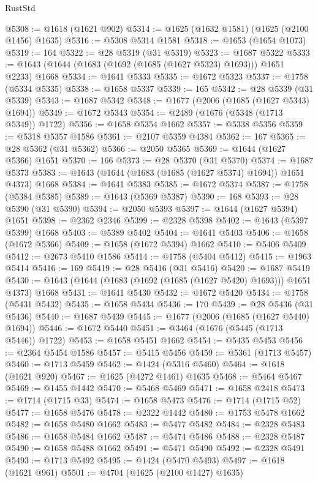 \begin{lexlean}{RustStd}
\begin{coremodule}
@5308 := @1618 (@1621 @902)
@5314 := @1625 (@1632 @1581) (@1625 (@2100 @1456) @1635)
@5316 := @5308 @5314 @1581
@5318 := @1653 (@1654 @1073)
@5319 := 164
@5322 := @28 @5319 (@31 @5319)
@5323 := @1687 @5322
@5333 := @1643 (@1644 (@1683 (@1692 (@1685 (@1627 @5323) @1693))) @1651 @2233) @1668
@5334 := @1641 @5333
@5335 := @1672 @5323
@5337 := @1758 (@5334 @5335)
@5338 := @1658 @5337
@5339 := 165
@5342 := @28 @5339 (@31 @5339)
@5343 := @1687 @5342
@5348 := @1677 (@2006 (@1685 (@1627 @5343) @1694))
@5349 := @1672 @5343
@5354 := @2489 (@1676 (@5348 (@1713 @5349)) @1722)
@5356 := @1658 @5354 @1662
@5357 := @5338 @5356
@5359 := @5318 @5357 @1586
@5361 := @2107 @5359 @4384
@5362 := 167
@5365 := @28 @5362 (@31 @5362)
@5366 := @2050 @5365
@5369 := @1644 (@1627 @5366) @1651
@5370 := 166
@5373 := @28 @5370 (@31 @5370)
@5374 := @1687 @5373
@5383 := @1643 (@1644 (@1683 (@1685 (@1627 @5374) @1694)) @1651 @4373) @1668
@5384 := @1641 @5383
@5385 := @1672 @5374
@5387 := @1758 (@5384 @5385)
@5389 := @1643 (@5369 @5387)
@5390 := 168
@5393 := @28 @5390 (@31 @5390)
@5394 := @2050 @5393
@5397 := @1644 (@1627 @5394) @1651
@5398 := @2362 @2346
@5399 := @2328 @5398
@5402 := @1643 (@5397 @5399) @1668
@5403 := @5389 @5402
@5404 := @1641 @5403
@5406 := @1658 (@1672 @5366)
@5409 := @1658 (@1672 @5394) @1662
@5410 := @5406 @5409
@5412 := @2673 @5410 @1586
@5414 := @1758 (@5404 @5412)
@5415 := @1963 @5414
@5416 := 169
@5419 := @28 @5416 (@31 @5416)
@5420 := @1687 @5419
@5430 := @1643 (@1644 (@1683 (@1692 (@1685 (@1627 @5420) @1693))) @1651 @4373) @1668
@5431 := @1641 @5430
@5432 := @1672 @5420
@5434 := @1758 (@5431 @5432)
@5435 := @1658 @5434
@5436 := 170
@5439 := @28 @5436 (@31 @5436)
@5440 := @1687 @5439
@5445 := @1677 (@2006 (@1685 (@1627 @5440) @1694))
@5446 := @1672 @5440
@5451 := @3464 (@1676 (@5445 (@1713 @5446)) @1722)
@5453 := @1658 @5451 @1662
@5454 := @5435 @5453
@5456 := @2364 @5454 @1586
@5457 := @5415 @5456
@5459 := @5361 (@1713 @5457)
@5460 := @1713 @5459
@5462 := @1424 (@5316 @5460)
@5464 := @1618 (@1621 @920)
@5467 := @1625 (@4272 @1461) @1635
@5468 := @5464 @5467
@5469 := @1455 @1442
@5470 := @5468 @5469
@5471 := @1658 @2418
@5473 := @1714 (@1715 @33)
@5474 := @1658 @5473
@5476 := @1714 (@1715 @52)
@5477 := @1658 @5476
@5478 := @2322 @1442
@5480 := @1753 @5478 @1662
@5482 := @1658 @5480 @1662
@5483 := @5477 @5482
@5484 := @2328 @5483
@5486 := @1658 @5484 @1662
@5487 := @5474 @5486
@5488 := @2328 @5487
@5490 := @1658 @5488 @1662
@5491 := @5471 @5490
@5492 := @2328 @5491
@5493 := @1713 @5492
@5495 := @1424 (@5470 @5493)
@5497 := @1618 (@1621 @961)
@5501 := @4704 (@1625 (@2100 @1427) @1635)

\end{coremodule}
\end{lexlean}

